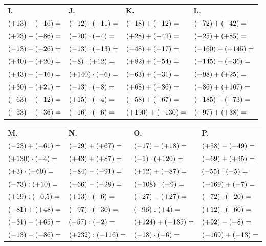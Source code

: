 {\bigskip
\begin{tabularx}{\linewidth}{*{4}{X}}
\textbf{I.} & \textbf{J.} & \textbf{K.} & \textbf{L.} \\
$(+13)-(-16)= \dotfill$ & $(-12)\cdot(-11)= \dotfill$ & $(-18)+(-12)= \dotfill$ & $(-72)+(-42)= \dotfill$ \\
$(+23)-(-86)= \dotfill$ & $(-20)\cdot(-4)= \dotfill$ & $(+28)+(-42)= \dotfill$ & $(-25)+(+85)= \dotfill$ \\
$(-13)-(-26)= \dotfill$ & $(-13)\cdot(-13)= \dotfill$ & $(-48)+(+17)= \dotfill$ & $(-160)+(+145)= \dotfill$ \\
$(+40)-(+20)= \dotfill$ & $(-8)\cdot(+12)= \dotfill$ & $(+82)+(+54)= \dotfill$ & $(-145)+(+36)= \dotfill$ \\
$(+43)-(-16)= \dotfill$ & $(+140)\cdot(-6)= \dotfill$ & $(-63)+(-31)= \dotfill$ & $(+98)+(+25)= \dotfill$ \\
$(+30)-(+21)= \dotfill$ & $(-13)\cdot(-8)= \dotfill$ & $(+68)+(+36)= \dotfill$ & $(-86)+(+167)= \dotfill$ \\
$(-63)-(-12)= \dotfill$ & $(+15)\cdot(-4)= \dotfill$ & $(-58)+(+67)= \dotfill$ & $(-185)+(+73)= \dotfill$ \\
$(-53)-(-36)= \dotfill$ & $(-16)\cdot(-6)= \dotfill$ & $(+190)+(-130)= \dotfill$ & $(+97)+(+38)= \dotfill$ \\
\end{tabularx}

\bigskip
\begin{tabularx}{\linewidth}{*{4}{X}}
\textbf{M.} & \textbf{N.} & \textbf{O.} & \textbf{P.} \\
$(-23)+(-61)= \dotfill$ & $(-29)+(+67)= \dotfill$ & $(-17)-(+18)= \dotfill$ & $(+58)-(-49)= \dotfill$ \\
$(+130)\cdot(-4)= \dotfill$ & $(+43)+(+87)= \dotfill$ & $(-1)\cdot(+120)= \dotfill$ & $(-69)+(+35)= \dotfill$ \\
$(+3)\cdot(-69)= \dotfill$ & $(-84)-(-91)= \dotfill$ & $(+12)+(-87)= \dotfill$ & $(-55):(-5)= \dotfill$ \\
$(-73):(+10)= \dotfill$ & $(-66)-(-28)= \dotfill$ & $(-108):(-9)= \dotfill$ & $(-169)+(-7)= \dotfill$ \\
$(+19):(-0{,}5)= \dotfill$ & $(+13)\cdot(+6)= \dotfill$ & $(-27)-(+27)= \dotfill$ & $(-72)\cdot(-20)= \dotfill$ \\
$(-81)+(+48)= \dotfill$ & $(-97)\cdot(+30)= \dotfill$ & $(-96):(+4)= \dotfill$ & $(+12)\cdot(+60)= \dotfill$ \\
$(-31)-(+65)= \dotfill$ & $(-57):(-2)= \dotfill$ & $(+124)+(-135)= \dotfill$ & $(+92)-(-8)= \dotfill$ \\
$(-13)-(-86)= \dotfill$ & $(+232):(-116)= \dotfill$ & $(-18)\cdot(-6)= \dotfill$ & $(-169)+(-13)= \dotfill$ \\
\end{tabularx}}